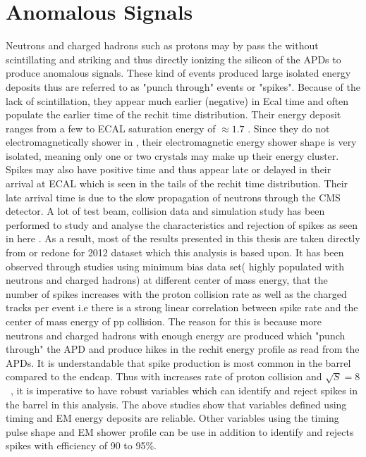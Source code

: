 \section{Anomalous Signals}
Neutrons and charged hadrons such as protons may by pass the \pb without scintillating and striking and thus directly ionizing the silicon of the APDs to produce anomalous signals. These kind of events produced large isolated energy deposits thus are referred to as "punch through" events or "spikes". Because of the lack of scintillation, they appear much earlier (negative) in Ecal time and often populate the earlier time of the rechit time distribution. Their energy deposit ranges from a few \GeV to ECAL saturation energy of $\approx 1.7$ \TeV. Since they do not electromagnetically shower in \pb, their electromagnetic energy shower shape is  very isolated, meaning only one or two crystals may make up their energy cluster. Spikes may also have positive time and thus appear late or delayed in their arrival at ECAL which is seen in the tails of the rechit time distribution. Their late arrival time is due to the slow propagation of neutrons through the CMS detector.
A lot of test beam, collision data and simulation study has been performed to study and analyse the characteristics and rejection of spikes as seen in here \cite{spike}. 
As a result, most of the results presented in this thesis are taken directly from \cite{spike} or redone for 2012 dataset which this analysis is based upon. It has been observed through studies using minimum bias data set( highly populated with neutrons and  charged hadrons) at different center of mass energy, that the number of spikes increases with the proton collision rate as well as the charged tracks per event i.e there is a strong linear correlation between spike rate and the center of mass energy of pp collision. The reason for this is because more neutrons and charged hadrons with enough energy are produced which "punch through" the APD and produce hikes in the rechit energy profile as read from the APDs. It is understandable that spike production is most common in the barrel compared to the endcap. Thus with increases rate of proton collision and  $\sqrt{S} = 8$~\TeV, it is imperative to have robust variables which can identify and reject spikes in the barrel in this analysis.  
The  above studies show that variables defined using timing and EM energy deposits are reliable. Other variables using the timing pulse shape and EM shower profile can be use in addition to identify and rejects spikes with  efficiency of 90 to 95\%.
